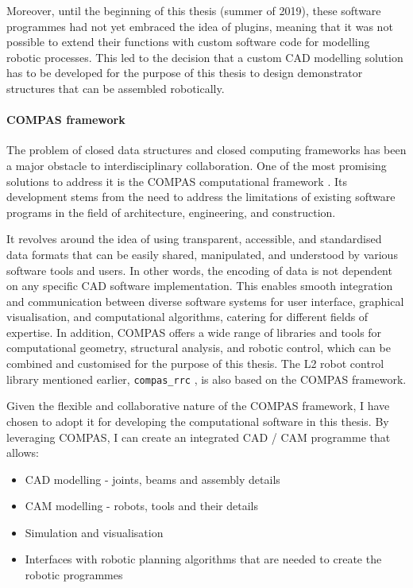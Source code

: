 Moreover, until the beginning of this thesis (summer of 2019), these software programmes had not yet embraced the idea of plugins, meaning that it was not possible to extend their functions with custom software code for modelling robotic processes. This led to the decision that a custom CAD modelling solution has to be developed for the purpose of this thesis to design demonstrator structures that can be assembled robotically.

\paragraph{COMPAS framework}

The problem of closed data structures and closed computing frameworks has been a major obstacle to interdisciplinary collaboration. One of the most promising solutions to address it is the COMPAS computational framework \parencite{meleCOMPASFrameworkComputational2017}. Its development stems from the need to address the limitations of existing software programs in the field of architecture, engineering, and construction.

It revolves around the idea of using transparent, accessible, and standardised data formats that can be easily shared, manipulated, and understood by various software tools and users. In other words, the encoding of data is not dependent on any specific CAD software implementation. This enables smooth integration and communication between diverse software systems for user interface, graphical visualisation, and computational algorithms, catering for different fields of expertise. In addition, COMPAS offers a wide range of libraries and tools for computational geometry, structural analysis, and robotic control, which can be combined and customised for the purpose of this thesis. The L2 robot control library mentioned earlier, \verb|compas_rrc| \parencite{fleischmannCOMPASRRCOnline2020} , is also based on the COMPAS framework.

Given the flexible and collaborative nature of the COMPAS framework, I have chosen to adopt it for developing the computational software in this thesis. By leveraging COMPAS, I can create an integrated CAD / CAM programme that allows:

\begin{itemize}[nosep]
    \item CAD modelling - joints, beams and assembly details 
    \item CAM modelling - robots, tools and their details 
    \item Simulation and visualisation 
    \item Interfaces with robotic planning algorithms that are needed to create the robotic programmes 
\end{itemize}


